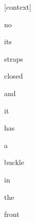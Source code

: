 \documentclass[varwidth]{standalone}
\begin{document}
\begin{CJK*}{UTF8}{gbsn}
{\setlength{\fboxsep}{0pt}\colorbox{white!0}{\parbox{0.9\textwidth}{
\colorbox{red!0.18250179290771484}{\strut [context]} \colorbox{red!0.4119538366794586}{\strut no} \colorbox{red!0.13467788696289062}{\strut its} \colorbox{red!0.016285443678498268}{\strut straps} \colorbox{red!4.004689693450928}{\strut closed} \colorbox{red!5.4564595222473145}{\strut and} \colorbox{red!0.20635491609573364}{\strut it} \colorbox{red!0.7883431315422058}{\strut has} \colorbox{red!12.381207466125488}{\strut a} \colorbox{red!65.12157440185547}{\strut buckle} \colorbox{red!9.389101028442383}{\strut in} \colorbox{red!0.7203376293182373}{\strut the} \colorbox{red!1.1865100860595703}{\strut front} 
}}}
\end{CJK*}
\end{document}
